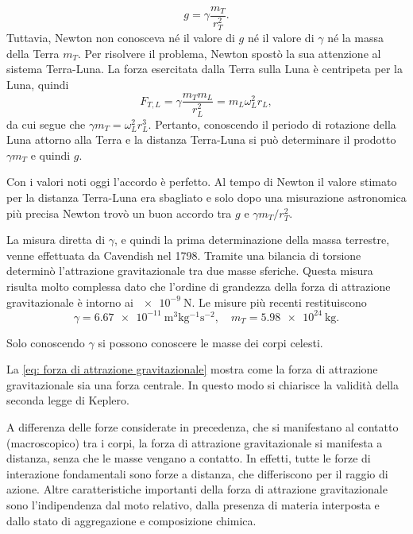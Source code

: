 \begin{equation}
    g=\gamma\frac{m_T}{r_T^2}.
\end{equation}
Tuttavia, Newton non conosceva né il valore di $g$ né il valore di $\gamma$ né la massa della Terra $m_T$. Per risolvere il problema, Newton spostò la sua attenzione al sistema Terra-Luna. La forza esercitata dalla Terra sulla Luna è centripeta per la Luna, quindi
\begin{equation}
    F_{T,L}=\gamma\frac{m_Tm_L}{r^2_L}=m_L\omega_L^2r_L,
\end{equation}
da cui segue che $\gamma m_T=\omega_L^2r_L^3$. Pertanto, conoscendo il periodo di rotazione della Luna attorno alla Terra e la distanza Terra-Luna si può determinare il prodotto $\gamma m_T$ e quindi $g$. 

Con i valori noti oggi l'accordo è perfetto. Al tempo di Newton il valore stimato per la distanza Terra-Luna era sbagliato e solo dopo una misurazione astronomica più precisa Newton trovò un buon accordo tra $g$ e $\gamma m_T/r_T^2$. 

La misura diretta di $\gamma$, e quindi la prima determinazione della massa terrestre, venne effettuata da Cavendish nel 1798. Tramite una bilancia di torsione determinò l'attrazione gravitazionale tra due masse sferiche. Questa misura risulta molto complessa dato che l'ordine di grandezza della forza di attrazione gravitazionale è intorno ai $\SI{e-9}{\N}$. Le misure più recenti restituiscono 
\begin{equation}
    \gamma=\SI{6.67e-11}{\meter^{3}\kg^{-1}\s^{-2}},\quad m_T=\SI{5.98e24}{\kg}.
\end{equation}
\begin{obs}
    Solo conoscendo $\gamma$ si possono conoscere le masse dei corpi celesti.
\end{obs}
La \eqref{eq: forza di attrazione gravitazionale} mostra come la forza di attrazione gravitazionale sia una forza centrale. In questo modo si chiarisce la validità della seconda legge di Keplero. 

A differenza delle forze considerate in precedenza, che si manifestano al contatto (macroscopico) tra i corpi, la forza di attrazione gravitazionale si manifesta a distanza, senza che le masse vengano a contatto. In effetti, tutte le forze di interazione fondamentali sono forze a distanza, che differiscono per il raggio di azione. Altre caratteristiche importanti della forza di attrazione gravitazionale sono l'indipendenza dal moto relativo, dalla presenza di materia interposta e dallo stato di aggregazione e composizione chimica. 


